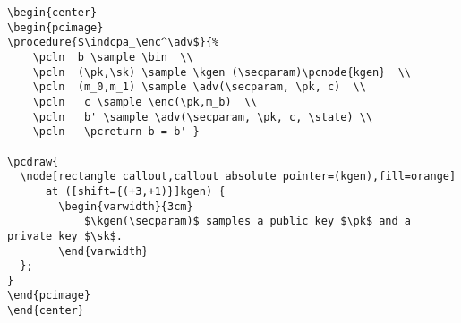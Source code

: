 \documentclass[a4paper]{report}
\begin{document}
\begin{lstlisting}
\begin{center}
\begin{pcimage}
\procedure{$\indcpa_\enc^\adv$}{%
	\pcln  b \sample \bin  \\
	\pcln  (\pk,\sk) \sample \kgen (\secparam)\pcnode{kgen}  \\
	\pcln  (m_0,m_1) \sample \adv(\secparam, \pk, c)  \\
	\pcln   c \sample \enc(\pk,m_b)  \\
	\pcln   b' \sample \adv(\secparam, \pk, c, \state) \\
	\pcln   \pcreturn b = b' }

\pcdraw{
  \node[rectangle callout,callout absolute pointer=(kgen),fill=orange]
      at ([shift={(+3,+1)}]kgen) {
		\begin{varwidth}{3cm}
			$\kgen(\secparam)$ samples a public key $\pk$ and a private key $\sk$.
		\end{varwidth}
  };
}
\end{pcimage}
\end{center}
\end{lstlisting}
\end{document}

